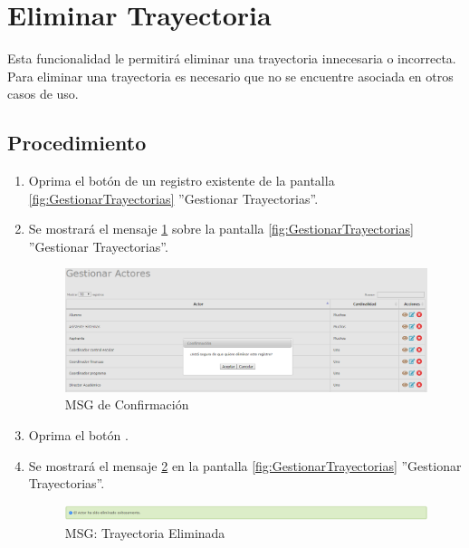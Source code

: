 \hypertarget{cv:eliminarTray}{\section{Eliminar Trayectoria}} \label{sec:eliminarTray}

	Esta funcionalidad le permitirá eliminar una trayectoria innecesaria o incorrecta. Para eliminar una trayectoria es necesario que no se encuentre asociada en otros casos de uso.

		\subsection{Procedimiento}

			\begin{enumerate}
	
			\item Oprima el botón \IUBotonEliminar{} de un registro existente de la pantalla \ref{fig:GestionarTrayectorias} ''Gestionar Trayectorias''.
	
			\item Se mostrará el mensaje \ref{fig:confirmaEliminaTray} sobre la pantalla \ref{fig:GestionarTrayectorias} ''Gestionar Trayectorias''.
			
			\begin{figure}[htbp!]
				\begin{center}
					\includegraphics[scale=0.5]{roles/lider/actor/pantallas/IU10-3MSG10}
					\caption{MSG de Confirmación}
					\label{fig:confirmaEliminaTray}
				\end{center}
			\end{figure}
						
			\item Oprima el botón \IUAceptar.
			
			\item Se mostrará el mensaje \ref{fig:trayEliminada} en la pantalla \ref{fig:GestionarTrayectorias} ''Gestionar Trayectorias''.
			
			\begin{figure}[htbp!]
				\begin{center}
					\includegraphics[scale=0.5]{roles/lider/actor/pantallas/IU10-3MSG1}
					\caption{MSG: Trayectoria Eliminada}
					\label{fig:trayEliminada}
				\end{center}
			\end{figure}
			\end{enumerate}